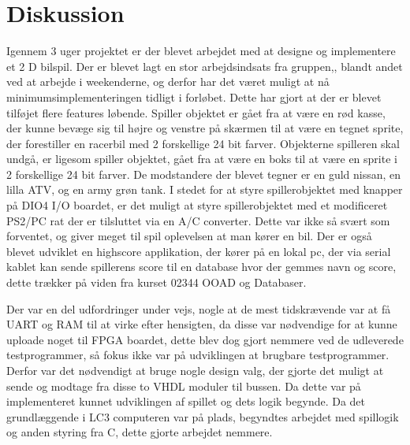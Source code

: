 \chapter{Diskussion}\label{cha:diskussion}

Igennem 3 uger projektet er der blevet arbejdet med at designe og implementere et 2 D bilspil. Der er blevet lagt en stor arbejdsindsats fra gruppen,, blandt andet ved at arbejde i weekenderne, og derfor har det været muligt at nå minimumsimplementeringen tidligt i forløbet. Dette har gjort at der er blevet tilføjet flere features løbende. Spiller objektet er gået fra at være en rød kasse, der kunne bevæge sig til højre og venstre på skærmen til at være en tegnet sprite, der forestiller en racerbil med 2 forskellige 24 bit farver. Objekterne spilleren skal undgå, er ligesom spiller objektet, gået fra at være en boks til at være en sprite i 2 forskellige 24 bit farver. De modstandere der blevet tegner er en guld nissan, en lilla ATV, og en army grøn tank.
 I stedet for at styre spillerobjektet med knapper på DIO4 I/O boardet, er det muligt at styre spillerobjektet med et modificeret PS2/PC rat der er tilsluttet via en A/C converter. Dette var ikke så svært som forventet, og giver meget til spil oplevelsen at man kører en bil.
  Der er også blevet udviklet en highscore applikation, der kører på en lokal pc, der via serial kablet kan sende spillerens score til en database hvor der gemmes navn og score, dette trækker på viden fra kurset 02344 OOAD og Databaser.

 Der var en del udfordringer under vejs, nogle at de mest tidskrævende var at få UART og RAM til at virke efter hensigten, da disse var nødvendige for at kunne uploade noget til FPGA boardet, dette blev dog gjort nemmere ved de udleverede testprogrammer, så fokus ikke var på udviklingen at brugbare testprogrammer. Derfor var det nødvendigt at bruge nogle design valg, der gjorte det muligt at sende og modtage fra disse to VHDL moduler til bussen. Da dette var på implementeret kunnet udviklingen af spillet og dets logik begynde. 
 Da det grundlæggende i LC3 computeren var på plads, begyndtes arbejdet med spillogik og anden styring fra C, dette gjorte arbejdet nemmere. %
 


